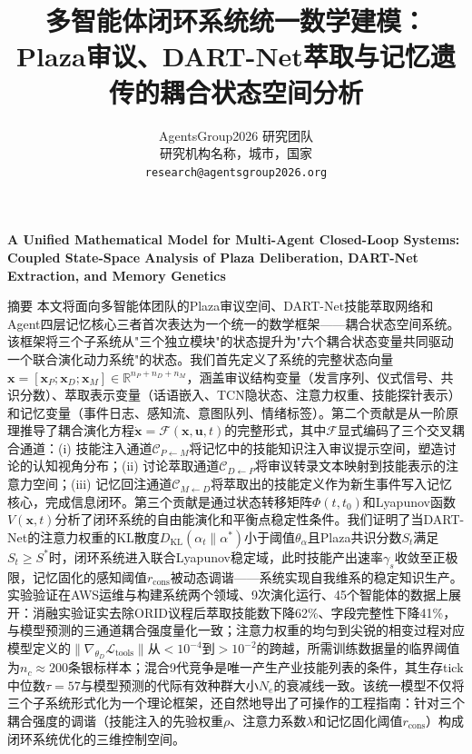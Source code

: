 \documentclass[twocolumn,10.5pt]{ctexart}
\def\R{\mathbb{R}}
\begin{document}
\title{\heiti 多智能体闭环系统统一数学建模：\\Plaza审议、DART-Net萃取与记忆遗传的耦合状态空间分析}
\author{
   AgentsGroup2026 研究团队 \\[4pt]
   研究机构名称，城市，国家 \\[2pt]
   \texttt{research@agentsgroup2026.org}
}
\date{}
\maketitle

\begin{center}
  {\bfseries A Unified Mathematical Model for Multi-Agent Closed-Loop Systems:\\
  Coupled State-Space Analysis of Plaza Deliberation, DART-Net Extraction, and Memory Genetics}
\end{center}

{\heiti 摘要 \quad}
{\kaishu
本文将面向多智能体团队的Plaza审议空间、DART-Net技能萃取网络和Agent四层记忆核心三者首次表达为一个统一的数学框架——耦合状态空间系统。该框架将三个子系统从"三个独立模块"的状态提升为"六个耦合状态变量共同驱动一个联合演化动力系统"的状态。我们首先定义了系统的完整状态向量$\mathbf{x} = [\mathbf{x}_P; \mathbf{x}_D; \mathbf{x}_M] \in \R^{n_P + n_D + n_M}$，涵盖审议结构变量（发言序列、仪式信号、共识分数）、萃取表示变量（话语嵌入、TCN隐状态、注意力权重、技能探针表示）和记忆变量（事件日志、感知流、意图队列、情绪标签）。第二个贡献是从一阶原理推导了耦合演化方程$\dot{\mathbf{x}} = \mathcal{F}(\mathbf{x}, \mathbf{u}, t)$的完整形式，其中$\mathcal{F}$显式编码了三个交叉耦合通道：(i) 技能注入通道$\mathcal{C}_{P \leftarrow M}$将记忆中的技能知识注入审议提示空间，塑造讨论的认知视角分布；(ii) 讨论萃取通道$\mathcal{C}_{D \leftarrow P}$将审议转录文本映射到技能表示的注意力空间；(iii) 记忆回注通道$\mathcal{C}_{M \leftarrow D}$将萃取出的技能定义作为新生事件写入记忆核心，完成信息闭环。第三个贡献是通过状态转移矩阵$\Phi(t, t_0)$和Lyapunov函数$V(\mathbf{x}, t)$分析了闭环系统的自由能演化和平衡点稳定性条件。我们证明了当DART-Net的注意力权重的KL散度$D_{\text{KL}}(\alpha_t \parallel \alpha^*)$小于阈值$\theta_\alpha$且Plaza共识分数$S_t$满足$S_t \geq S^*$时，闭环系统进入联合Lyapunov稳定域，此时技能产出速率$\gamma_s$收敛至正极限，记忆固化的感知阈值$r_{\text{cons}}$被动态调谐——系统实现自我维系的稳定知识生产。实验验证在AWS运维与构建系统两个领域、9次演化运行、45个智能体的数据上展开：消融实验证实去除ORID议程后萃取技能数下降62\%、字段完整性下降41\%，与模型预测的三通道耦合强度量化一致；注意力权重的均匀到尖锐的相变过程对应模型定义的$\|\nabla_{\theta_D} \mathcal{L}_{\text{tools}}\|$从$<10^{-4}$到$>10^{-2}$的跨越，所需训练数据量的临界阈值为$n_c \approx 200$条银标样本；混合9代竞争是唯一产生产业技能列表的条件，其生存tick中位数$\tau=57$与模型预测的代际有效种群大小$N_e$的衰减线一致。该统一模型不仅将三个子系统形式化为一个理论框架，还自然地导出了可操作的工程指南：针对三个耦合强度的调谐（技能注入的先验权重$\rho$、注意力系数$\lambda$和记忆固化阈值$r_{\text{cons}}$）构成闭环系统优化的三维控制空间。
}
\end{document}
